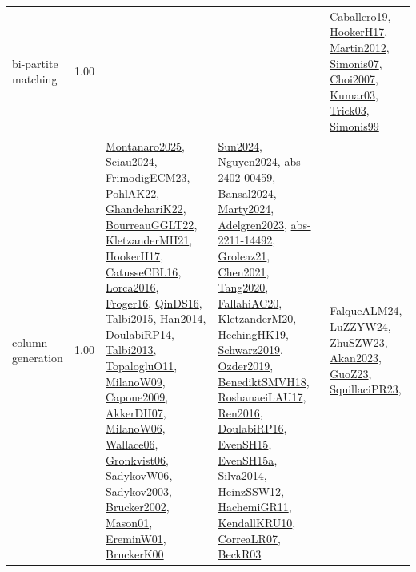 {\begin{longtable}{p{3cm}r>{\raggedright\arraybackslash}p{6cm}>{\raggedright\arraybackslash}p{6cm}>{\raggedright\arraybackslash}p{8cm}}
\index{bi-partite matching}\index{Algorithms!bi-partite matching}bi-partite matching &  1.00 &  &  & \hyperref[detail:Caballero19]{Caballero19}, \hyperref[detail:HookerH17]{HookerH17}, \hyperref[detail:Martin2012]{Martin2012}, \hyperref[detail:Simonis07]{Simonis07}, \hyperref[detail:Choi2007]{Choi2007}, \hyperref[detail:Kumar03]{Kumar03}, \hyperref[detail:Trick03]{Trick03}, \hyperref[detail:Simonis99]{Simonis99}\\
\index{column generation}\index{Algorithms!column generation}column generation &  1.00 & \hyperref[detail:Montanaro2025]{Montanaro2025}, \hyperref[detail:Sciau2024]{Sciau2024}, \hyperref[detail:FrimodigECM23]{FrimodigECM23}, \hyperref[detail:PohlAK22]{PohlAK22}, \hyperref[detail:GhandehariK22]{GhandehariK22}, \hyperref[detail:BourreauGGLT22]{BourreauGGLT22}, \hyperref[detail:KletzanderMH21]{KletzanderMH21}, \hyperref[detail:HookerH17]{HookerH17}, \hyperref[detail:CatusseCBL16]{CatusseCBL16}, \hyperref[detail:Lorca2016]{Lorca2016}, \hyperref[detail:Froger16]{Froger16}, \hyperref[detail:QinDS16]{QinDS16}, \hyperref[detail:Talbi2015]{Talbi2015}, \hyperref[detail:Han2014]{Han2014}, \hyperref[detail:DoulabiRP14]{DoulabiRP14}, \hyperref[detail:Talbi2013]{Talbi2013}, \hyperref[detail:TopalogluO11]{TopalogluO11}, \hyperref[detail:MilanoW09]{MilanoW09}, \hyperref[detail:Capone2009]{Capone2009}, \hyperref[detail:AkkerDH07]{AkkerDH07}, \hyperref[detail:MilanoW06]{MilanoW06}, \hyperref[detail:Wallace06]{Wallace06}, \hyperref[detail:Gronkvist06]{Gronkvist06}, \hyperref[detail:SadykovW06]{SadykovW06}, \hyperref[detail:Sadykov2003]{Sadykov2003}, \hyperref[detail:Brucker2002]{Brucker2002}, \hyperref[detail:Mason01]{Mason01}, \hyperref[detail:EreminW01]{EreminW01}, \hyperref[detail:BruckerK00]{BruckerK00} & \hyperref[detail:Sun2024]{Sun2024}, \hyperref[detail:Nguyen2024]{Nguyen2024}, \hyperref[detail:abs-2402-00459]{abs-2402-00459}, \hyperref[detail:Bansal2024]{Bansal2024}, \hyperref[detail:Marty2024]{Marty2024}, \hyperref[detail:Adelgren2023]{Adelgren2023}, \hyperref[detail:abs-2211-14492]{abs-2211-14492}, \hyperref[detail:Groleaz21]{Groleaz21}, \hyperref[detail:Chen2021]{Chen2021}, \hyperref[detail:Tang2020]{Tang2020}, \hyperref[detail:FallahiAC20]{FallahiAC20}, \hyperref[detail:KletzanderM20]{KletzanderM20}, \hyperref[detail:HechingHK19]{HechingHK19}, \hyperref[detail:Schwarz2019]{Schwarz2019}, \hyperref[detail:Ozder2019]{Ozder2019}, \hyperref[detail:BenediktSMVH18]{BenediktSMVH18}, \hyperref[detail:RoshanaeiLAU17]{RoshanaeiLAU17}, \hyperref[detail:Ren2016]{Ren2016}, \hyperref[detail:DoulabiRP16]{DoulabiRP16}, \hyperref[detail:EvenSH15]{EvenSH15}, \hyperref[detail:EvenSH15a]{EvenSH15a}, \hyperref[detail:Silva2014]{Silva2014}, \hyperref[detail:HeinzSSW12]{HeinzSSW12}, \hyperref[detail:HachemiGR11]{HachemiGR11}, \hyperref[detail:KendallKRU10]{KendallKRU10}, \hyperref[detail:CorreaLR07]{CorreaLR07}, \hyperref[detail:BeckR03]{BeckR03} & \hyperref[detail:FalqueALM24]{FalqueALM24}, \hyperref[detail:LuZZYW24]{LuZZYW24}, \hyperref[detail:ZhuSZW23]{ZhuSZW23}, \hyperref[detail:Akan2023]{Akan2023}, \hyperref[detail:GuoZ23]{GuoZ23}, \hyperref[detail:SquillaciPR23]{SquillaciPR23}, 
\end{longtable}}

